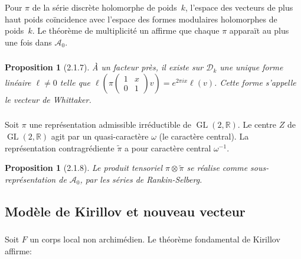 \documentclass[11pt,a4paper]{amsart}
\theoremstyle{plain}
\newtheorem{proposition}[theorem]{Proposition}
\theoremstyle{definition}
\theoremstyle{remark}
\DeclareMathOperator{\GL}{GL}
\newcommand{\RR}{\mathbb{R}}
\newcommand{\cD}{\mathcal{D}}
\newcommand{\cA}{\mathcal{A}}
\begin{document}
Pour $\pi$ de la s\'erie discr\`ete holomorphe de poids~$k$, l'espace des vecteurs de plus haut poids co\" incidence avec l'espace des formes modulaires holomorphes de poids~$k$. Le th\'eor\`eme de multiplicit\'e un affirme que chaque $\pi$ appara\" it au plus une fois dans $\cA_0$.

\subsubsection{}
\label{sec:2.1.7}

\begin{proposition}[2.1.7] \label{prop:2.1.7}
\`A un facteur pr\`es, il existe sur $\cD_k$ une unique forme lin\'eaire $\ell \neq 0$ telle que $\ell\left(\pi\begin{pmatrix} 1 & x \\ 0 & 1 \end{pmatrix} v\right) = e^{2\pi i x} \ell(v)$. Cette forme s'appelle le \emph{vecteur de Whittaker}.
\end{proposition}

\subsubsection{}
\label{sec:2.1.8}

Soit $\pi$ une repr\'esentation admissible irr\'eductible de $\GL(2,\RR)$. Le centre $Z$ de $\GL(2,\RR)$ agit par un quasi-caract\`ere $\omega$ (le caract\`ere central). La repr\'esentation contragr\'ediente $\widetilde{\pi}$ a pour caract\`ere central $\omega^{-1}$.

\begin{proposition}[2.1.8] \label{prop:2.1.8}
Le produit tensoriel $\pi \otimes \widetilde{\pi}$ se r\'ealise comme sous-repr\'esentation de $\cA_0$, par les s\'eries de Rankin-Selberg.
\end{proposition}

\subsection{Mod\`ele de Kirillov et nouveau vecteur}

\subsubsection{}
\label{sec:2.2.1}

Soit $F$ un corps local non archim\'edien. Le th\'eor\`eme fondamental de Kirillov affirme:
\end{document}
